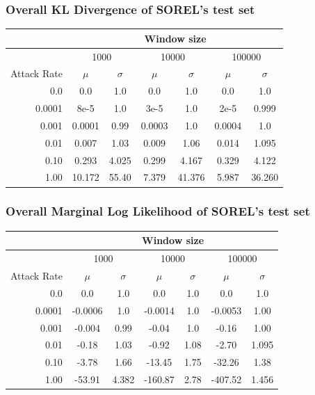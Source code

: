 \documentclass{beamer}
\begin{document}
\begin{frame}
    \frametitle{Overall KL Divergence of SOREL's test set}
    \begin{tabular}{| r | c c | c c | c c |}
        \hline
         & \multicolumn{6}{|c|}{Window size} \\
        \hline
         & \multicolumn{2}{|c|}{1000} & \multicolumn{2}{|c|}{10000} & \multicolumn{2}{|c|}{100000} \\
        \hline
        Attack Rate & $\mu$ & $\sigma$ & $\mu$ & $\sigma$ & $\mu$ & $\sigma$ \\
        \hline
        0.0 & 0.0 & 1.0 & 0.0 & 1.0 & 0.0 & 1.0 \\
        \hline
        0.0001 & 8e-5 & 1.0 & 3e-5 & 1.0 & 2e-5 & 0.999 \\
        \hline
        0.001 & 0.0001 & 0.99 & 0.0003 & 1.0 & 0.0004 & 1.0 \\
        \hline
        0.01 & 0.007 & 1.03 & 0.009 & 1.06 & 0.014 & 1.095 \\
        \hline
        0.10 & 0.293 & 4.025 & 0.299 & 4.167 & 0.329 & 4.122 \\
        \hline
        1.00 & 10.172 & 55.40 & 7.379 & 41.376 & 5.987 & 36.260 \\
        \hline
    \end{tabular}
\end{frame}

\begin{frame}
    \frametitle{Overall Marginal Log Likelihood of SOREL's test set}
    \begin{tabular}{| r | c c | c c | c c |}
        \hline
         & \multicolumn{6}{|c|}{Window size} \\
        \hline
         & \multicolumn{2}{|c|}{1000} & \multicolumn{2}{|c|}{10000} & \multicolumn{2}{|c|}{100000} \\
        \hline
        Attack Rate & $\mu$ & $\sigma$ & $\mu$ & $\sigma$ & $\mu$ & $\sigma$ \\
        \hline
        0.0 & 0.0 & 1.0 & 0.0 & 1.0 & 0.0 & 1.0 \\
        \hline
        0.0001 & -0.0006 & 1.0 & -0.0014 & 1.0 & -0.0053 & 1.00 \\
        \hline
        0.001 & -0.004 & 0.99 & -0.04 & 1.0 & -0.16 & 1.00 \\
        \hline
        0.01 & -0.18 & 1.03 & -0.92 & 1.08 & -2.70 & 1.095 \\
        \hline
        0.10 & -3.78 & 1.66 & -13.45 & 1.75 & -32.26 & 1.38 \\
        \hline
        1.00 & -53.91 & 4.382 & -160.87 & 2.78 & -407.52 & 1.456 \\
        \hline
    \end{tabular}
\end{frame}
\end{document}
